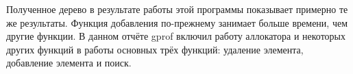 Полученное дерево в результате работы этой программы показывает примерно те же результаты. Функция добавления по-прежнему занимает больше времени, чем другие функции. В данном отчёте gprof включил работу аллокатора и некоторых других функций в работы основных трёх функций: удаление элемента, добавление элемента и поиск.



\pagebreak

